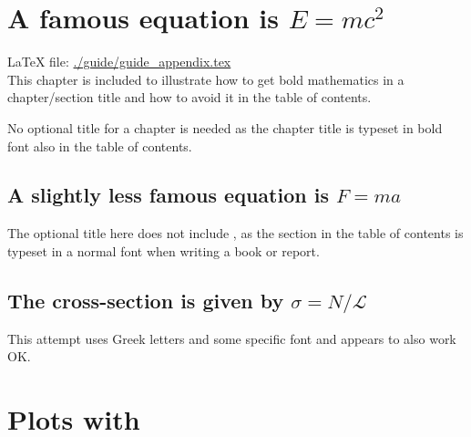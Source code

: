 \chapter{A famous equation is \boldmath$E = mc^{2}$}
\label{sec:emc2}

\LaTeX{} file: \url{./guide/guide_appendix.tex}\\[1ex]
\noindent
This chapter is included to illustrate how to get bold mathematics in
a chapter/section title and how to avoid it in the table of contents.

No optional title for a chapter is needed as the chapter title is typeset in bold
font also in the table of contents.

\section[A slightly less famous equation is $F = m a$]%
        {A slightly less famous equation is \boldmath$F = m a$}
\label{sec:fma}

The optional title here does not include , as the
section in the table of contents is typeset in a normal font when
writing a book or report.


\section[The cross-section is given by $\sigma = N / \mathcal{L}$]%
        {The cross-section is given by \boldmath$\sigma = N / \mathcal{L}$}
\label{sec:sig}

This attempt uses Greek letters and some specific font and appears to
also work OK.


\chapter{Plots with }
\label{sec:app:tikz}

